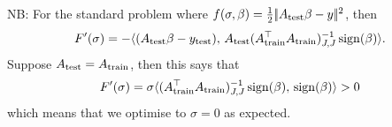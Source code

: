 \documentclass{article}
\begin{document}
NB: For the standard problem where $f(\sigma,\beta) =\frac12 |\!| A_{\mathrm{test}}\beta - y |\!|^2$, then
$$ 
F'(\sigma) = -\langle (A_{\mathrm{test}}\beta - y_{\mathrm{test}}),\,A_{\mathrm{test}} (A_{\mathrm{train}}^\top A_{\mathrm{train}})_{J,J}^{-1} \operatorname{sign}(\beta) \rangle .
$$
Suppose $A_{\mathrm{test}} = A_{\mathrm{train}}$, then this says that
$$
F'(\sigma) = \sigma\langle  (A_{\mathrm{train}}^\top A_{\mathrm{train}})_{J,J}^{-1} \operatorname{sign}(\beta),\,\operatorname{sign}(\beta)\rangle > 0
$$
which means that we optimise to $\sigma = 0$ as expected.
\end{document}
